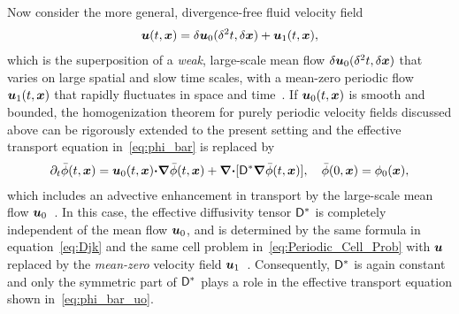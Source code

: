 \documentclass[amsa]{ipart}
\begin{document}
Now consider the  more general, divergence-free fluid velocity field
%
\begin{align}\label{eq:Velocity_field_uo_u1}
  \vecu(t,\vecx)=\delta\vecu_0(\delta^2 t,\delta\vecx)+\vecu_1(t,\vecx),
\end{align}
%
which is the superposition of a \emph{weak}, large-scale mean flow
$\delta\boldsymbol{u}_0(\delta^2t,\delta\boldsymbol{x})$ that varies on large spatial and slow time
scales, with a mean-zero periodic flow $\boldsymbol{u}_1(t,\boldsymbol{x})$ that rapidly
fluctuates in space and time~\cite{Majda:Kramer:1999:book}.
If $\boldsymbol{u}_0(t,\boldsymbol{x})$ is smooth and bounded, the homogenization
theorem for purely periodic velocity fields discussed above can be
rigorously extended to the present setting and the effective transport
equation in~\eqref{eq:phi_bar} is replaced
by~\cite{Majda:Kramer:1999:book}   
%
\begin{align}\label{eq:phi_bar_uo}
  \partial_t\bar{\phi}(t,\vecx)=\vecu_0(t,\vecx)\bcdot\bnabla\bar{\phi}(t,\vecx)
                   +\bnabla\bcdot[\Dm^*\bnabla\bar{\phi}(t,\vecx)],
  \quad 
  \bar{\phi}(0,\vecx)=\phi_0(\vecx),
\end{align}
%
which includes an advective enhancement in transport by the
large-scale mean flow $\boldsymbol{u}_0$~\cite{Majda:Kramer:1999:book}. In this
case, the effective diffusivity tensor $\mathsf{D}^*$ is completely
independent of the mean flow $\boldsymbol{u}_0$, and is determined by the same
formula in equation~\eqref{eq:Djk} and the same cell problem
in~\eqref{eq:Periodic_Cell_Prob} with
$\boldsymbol{u}$ replaced by the \emph{mean-zero} velocity field
$\boldsymbol{u}_1$~\cite{Majda:Kramer:1999:book}. Consequently, $\mathsf{D}^*$  
is again constant and only the symmetric part of $\mathsf{D}^*$ plays
a role in the effective transport equation shown
in~\eqref{eq:phi_bar_uo}.
\end{document}
